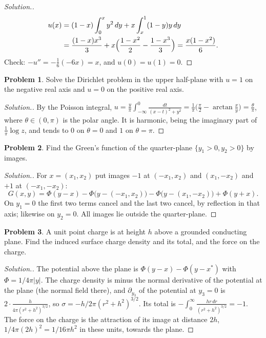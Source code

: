 \documentclass[11pt,a4paper]{article}
\numberwithin{equation}{section}
\theoremstyle{definition}
\newtheorem{problemx}{Problem}[subsection]
\newenvironment{problem}{\begin{problemx}}{\end{problemx}}
\newenvironment{solution}
  {\renewcommand{\qedsymbol}{}\begin{proof}[\textit{Solution}.]}
  {\end{proof}}
\begin{document}
\begin{solution}
\begin{align*}
u(x) &= (1 - x)\int_0^xy^2\,dy + x\int_x^1(1 - y)y\,dy \\
&= \frac{(1 - x)x^3}3 + x\Bigl(\frac{1 - x^2}2 - \frac{1 - x^3}3\Bigr) = \frac{x(1 - x^2)}6 .
\end{align*}
Check: $-u'' = -\frac16(-6x) = x$, and $u(0) = u(1) = 0$.
\end{solution}

\begin{problem}
Solve the Dirichlet problem in the upper half-plane with $u = 1$ on the negative real axis and $u = 0$ on the positive real axis.
\end{problem}

\begin{solution}
By the Poisson integral, $u = \frac y\pi\int_{-\infty}^0\frac{dt}{(x - t)^2 + y^2} = \frac1\pi\bigl(\frac\pi2 - \arctan\frac xy\bigr) = \frac\theta\pi$, where $\theta \in (0, \pi)$ is the polar angle. It is harmonic, being the imaginary part of $\frac1\pi\log z$, and tends to $0$ on $\theta = 0$ and $1$ on $\theta = \pi$.
\end{solution}

\begin{problem}
Find the Green's function of the quarter-plane $\{y_1 > 0, y_2 > 0\}$ by images.
\end{problem}

\begin{solution}
For $x = (x_1, x_2)$ put images $-1$ at $(-x_1, x_2)$ and $(x_1, -x_2)$ and $+1$ at $(-x_1, -x_2)$:
\[
G(x, y) = \Phi(y - x) - \Phi\bigl(y - (-x_1, x_2)\bigr) - \Phi\bigl(y - (x_1, -x_2)\bigr) + \Phi(y + x) .
\]
On $y_1 = 0$ the first two terms cancel and the last two cancel, by reflection in that axis; likewise on $y_2 = 0$. All images lie outside the quarter-plane.
\end{solution}

\begin{problem}
A unit point charge is at height $h$ above a grounded conducting plane. Find the induced surface charge density and its total, and the force on the charge.
\end{problem}

\begin{solution}
The potential above the plane is $\Phi(y - x) - \Phi(y - x^*)$ with $\Phi = 1/4\pi|y|$. The charge density is minus the normal derivative of the potential at the plane (the normal field there), and $\partial_{y_3}$ of the potential at $y_3 = 0$ is $2\cdot\frac{h}{4\pi(r^2 + h^2)^{3/2}}$, so $\sigma = -h/2\pi(r^2 + h^2)^{3/2}$. Its total is $-\int_0^\infty\frac{hr\,dr}{(r^2 + h^2)^{3/2}} = -1$. The force on the
charge is the attraction of its image at distance $2h$, $1/4\pi(2h)^2 = 1/16\pi h^2$ in these units, towards the plane.
\end{solution}
\end{document}
